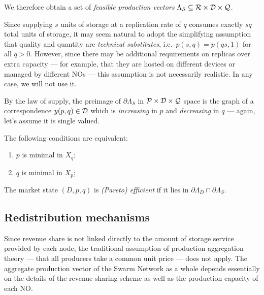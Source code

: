 We therefore obtain a set of \emph{feasible production vectors} $\Lambda_S\subseteq\mathcal{R}\times\mathcal{D}\times\mathcal{Q}$.

\begin{remark}

  Since supplying $s$ units of storage at a replication rate of $q$ consumes exactly $sq$ total units of storage, it may seem natural to adopt the simplifying assumption that quality and quantity are \emph{technical substitutes}, i.e.~$p(s,q)=p(qs,1)$ for all $q>0$.
  However, since there may be additional requirements on replicas over extra capacity --- for example, that they are hosted on different devices or managed by different NOs --- this assumption is not necessarily realistic.
  In any case, we will not use it.

\end{remark}

By the law of supply, the preimage of $\partial\Lambda_S$ in $\mathcal{P}\times\mathcal{D}\times\mathcal{Q}$ space is the graph of a correspondence $y(p,q)\in\mathcal{D}$ which is \emph{increasing} in $p$ and \emph{decreasing} in $q$ --- again, let's assume it is single valued.

\begin{proposition}
  \label{prop:efficiency}

  The following conditions are equivalent:
  \begin{enumerate}
    \item $p$ is minimal in $X_q$;
    \item $q$ is minimal in $X_p$;
  \end{enumerate}

\end{proposition}

\begin{definition}

  The market state $(D,p,q)$ is \emph{(Pareto) efficient} if it lies in $\partial\Lambda_D\cap\partial\Lambda_S$.

\end{definition}



\subsection{Redistribution mechanisms}
\label{section:redistribution}

Since revenue share is not linked directly to the amount of storage service provided by each node, the traditional assumption of production aggregation theory \cite[\S5.E]{mascollel1995microeconomic} --- that all producers take a common unit price --- does not apply.
%
The aggregate production vector of the Swarm Network as a whole depends essentially on the details of the revenue sharing scheme as well as the production capacity of each NO.

